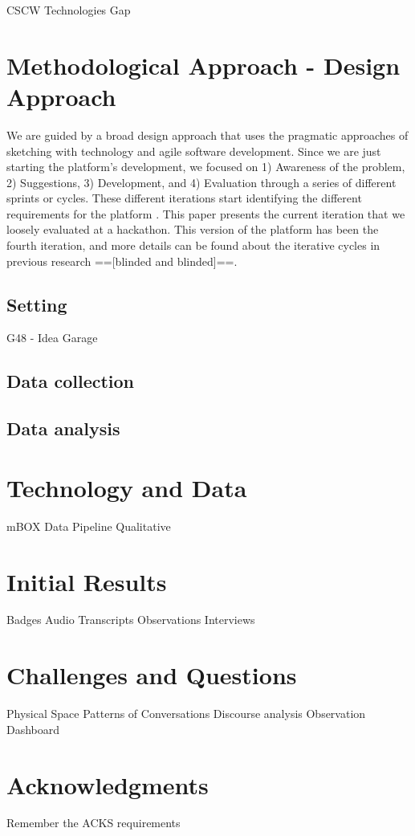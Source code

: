 \documentclass[sigconf,review,anonymous]{acmart}
\begin{document}
CSCW
Technologies
Gap

\section{Methodological Approach - Design Approach}
We are guided by a broad design approach that uses the pragmatic approaches of sketching with technology and agile software development.  Since we are just starting the platform's development, we focused on 1) Awareness of the problem, 2) Suggestions, 3) Development, and 4) Evaluation through a series of different sprints or cycles.  These different iterations start identifying the different requirements for the platform \cite{Gregor20}. This paper presents the current iteration that we loosely evaluated at a hackathon. This version of the platform has been the fourth iteration, and more details can be found about the iterative cycles in previous research ==[blinded and blinded]==.

\subsection{Setting}
G48 - Idea Garage

\subsection{Data collection}

\subsection{Data analysis}

\section{Technology and Data}
mBOX
Data Pipeline
Qualitative

\section{Initial Results}
Badges
Audio
Transcripts
Observations
Interviews

\section{Challenges and Questions}
Physical Space
Patterns of Conversations
Discourse analysis
Observation
Dashboard



\section{Acknowledgments}
Remember the ACKS requirements



\end{document}

